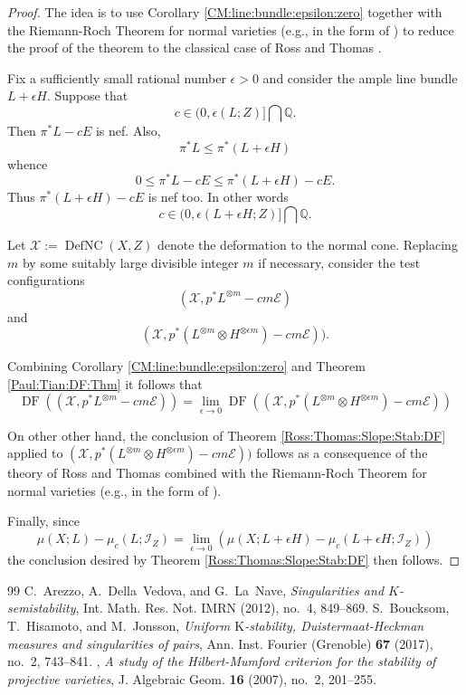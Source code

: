 \documentclass[10pt,a4paper]{amsart}
\newcommand{\Ish}{\mathcal{I}}
\newcommand{\QQ}{\mathbb{Q}} %
\renewcommand{\leq}{\leqslant}
\begin{document}
\begin{proof}
The idea is to use Corollary \ref{CM:line:bundle:epsilon:zero} together with the Riemann-Roch Theorem for normal varieties (e.g., in the form of \cite[Theorem A.1]{Boucksom-Hisamoto-Jonsson:2016}) to reduce the proof of the theorem to the classical case of Ross and Thomas \cite[Section 4]{Ross:Thomas:2007}.  

Fix a sufficiently small rational number $\epsilon > 0$ and consider the ample line bundle $L + \epsilon H$.  Suppose that 
$$c \in (0,\epsilon(L;Z)] \bigcap \QQ \text{.}$$  
Then $\pi^*L - c E$ is nef.  Also, 
$$\pi^*L \leq \pi^*(L+ \epsilon H)$$ 
whence 
$$0 \leq \pi^*L - c E \leq \pi^*(L+\epsilon H) - c E\text{.}$$  
Thus $\pi^*(L+\epsilon H) - c E$ is nef too.    In other words
$$
c \in (0,\epsilon(L+\epsilon H;Z)] \bigcap \QQ \text{.}
$$

Let $\mathcal{X} := \operatorname{DefNC}(X,Z)$ denote the deformation to the normal cone.   Replacing $m$ by some suitably large divisible integer $m$ if necessary, consider the test configurations 
$$(\mathcal{X}, p^*L^{\otimes m} - c m \mathcal{E})$$ 
and
$$(\mathcal{X}, p^*(L^{\otimes  m}  \otimes H^{\otimes \epsilon m}) - cm \mathcal{E}) ) \text{.}$$

Combining Corollary \ref{CM:line:bundle:epsilon:zero} and Theorem \ref{Paul:Tian:DF:Thm} it follows that
$$
\operatorname{DF}( (\mathcal{X}, p^*L^{\otimes m} - c m \mathcal{E}) ) = \lim\limits_{\epsilon \to 0} \operatorname{DF}( (\mathcal{X}, p^*(L^{\otimes m}  \otimes H^{\otimes \epsilon m}) - cm \mathcal{E})  ) 
$$

On other other hand, the conclusion of Theorem \ref{Ross:Thomas:Slope:Stab:DF} applied to $(\mathcal{X}, p^*(L^{\otimes  m}  \otimes H^{\otimes \epsilon m}) - cm \mathcal{E})  )$ follows as a consequence of the theory of Ross and Thomas \cite[Section 4]{Ross:Thomas:2007} combined  with the Riemann-Roch Theorem for normal varieties (e.g., in the form of \cite[Theorem A.1]{Boucksom-Hisamoto-Jonsson:2016}).

Finally, since
$$
\mu(X;L) - \mu_c(L;\Ish_Z) = \lim\limits_{\epsilon \to 0} (\mu(X;L+\epsilon H) - \mu_c(L+\epsilon H;\Ish_Z) )
$$
the conclusion desired by Theorem \ref{Ross:Thomas:Slope:Stab:DF} then follows.
\end{proof}

\begin{thebibliography}{99}
 C.~Arezzo, A.~Della~Vedova, and G.~La~Nave, \emph{Singularities and {$K$}-semistability}, Int. Math. Res. Not. IMRN (2012), no.~4, 849--869.
 S.~Boucksom, T.~Hisamoto, and M.~Jonsson, \emph{Uniform {$\mathrm{K}$}-stability, {D}uistermaat-{H}eckman measures and singularities of pairs}, Ann. Inst. Fourier (Grenoble) \textbf{67} (2017), no.~2, 743--841.
 \bysame, \emph{A study of the {H}ilbert-{M}umford criterion for the stability of projective varieties}, J. Algebraic Geom. \textbf{16} (2007), no.~2, 201--255.
\end{thebibliography}
\end{document}
